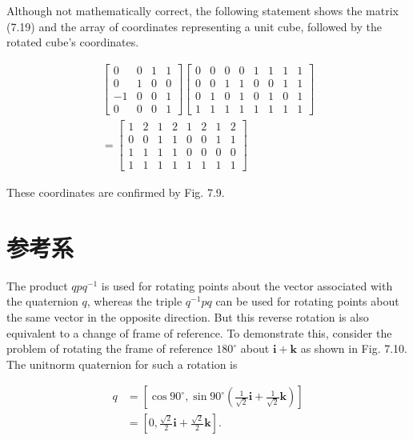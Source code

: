 Although not mathematically correct, the following statement shows the matrix (7.19) and the array of coordinates representing a unit cube, followed by the rotated cube's coordinates.

$$
\begin{gathered}
{\left[\begin{array}{cccc}
0 & 0 & 1 & 1 \\
0 & 1 & 0 & 0 \\
-1 & 0 & 0 & 1 \\
0 & 0 & 0 & 1
\end{array}\right]\left[\begin{array}{llllllll}
0 & 0 & 0 & 0 & 1 & 1 & 1 & 1 \\
0 & 0 & 1 & 1 & 0 & 0 & 1 & 1 \\
0 & 1 & 0 & 1 & 0 & 1 & 0 & 1 \\
1 & 1 & 1 & 1 & 1 & 1 & 1 & 1
\end{array}\right]} \\
=\left[\begin{array}{llllllll}
1 & 2 & 1 & 2 & 1 & 2 & 1 & 2 \\
0 & 0 & 1 & 1 & 0 & 0 & 1 & 1 \\
1 & 1 & 1 & 1 & 0 & 0 & 0 & 0 \\
1 & 1 & 1 & 1 & 1 & 1 & 1 & 1
\end{array}\right]
\end{gathered}
$$

These coordinates are confirmed by Fig. 7.9.

\section{参考系}
The product $q p q^{-1}$ is used for rotating points about the vector associated with the quaternion $q$, whereas the triple $q^{-1} p q$ can be used for rotating points about the same vector in the opposite direction. But this reverse rotation is also equivalent to a change of frame of reference. To demonstrate this, consider the problem of rotating the frame of reference $180^{\circ}$ about $\mathbf{i}+\mathbf{k}$ as shown in Fig. 7.10. The unitnorm quaternion for such a rotation is

$$
\begin{aligned}
q & =\left[\cos 90^{\circ}, \sin 90^{\circ}\left(\frac{1}{\sqrt{2}} \mathbf{i}+\frac{1}{\sqrt{2}} \mathbf{k}\right)\right] \\
& =\left[0, \frac{\sqrt{2}}{2} \mathbf{i}+\frac{\sqrt{2}}{2} \mathbf{k}\right] .
\end{aligned}
$$

